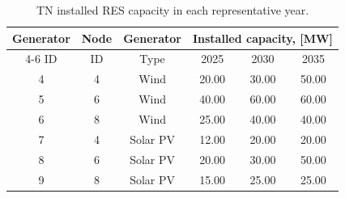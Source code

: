\begin{table}[htbp!]
    \centering
    \caption{TN installed RES capacity in each representative year.}
    \begin{tabular}{ccc ccc}
        \toprule
        Generator   & Node  & Generator & \multicolumn{3}{c}{Installed capacity, [MW]}\\  \cmidrule{4-6}
        ID          & ID    & Type      & 2025 & 2030 & 2035 \\ 
        \midrule
        4 & 4 & Wind & 20.00 & 30.00 & 50.00\\
        5 & 6 & Wind & 40.00 & 60.00 & 60.00\\
        6 & 8 & Wind & 25.00 & 40.00 & 40.00\\
        7 & 4 & Solar PV & 12.00 & 20.00 & 20.00\\
        8 & 6 & Solar PV & 20.00 & 30.00 & 50.00\\
        9 & 8 & Solar PV & 15.00 & 25.00 & 25.00\\
        \bottomrule
    \end{tabular}
    \label{tab:cs3_tn_res_generators}
\end{table}
